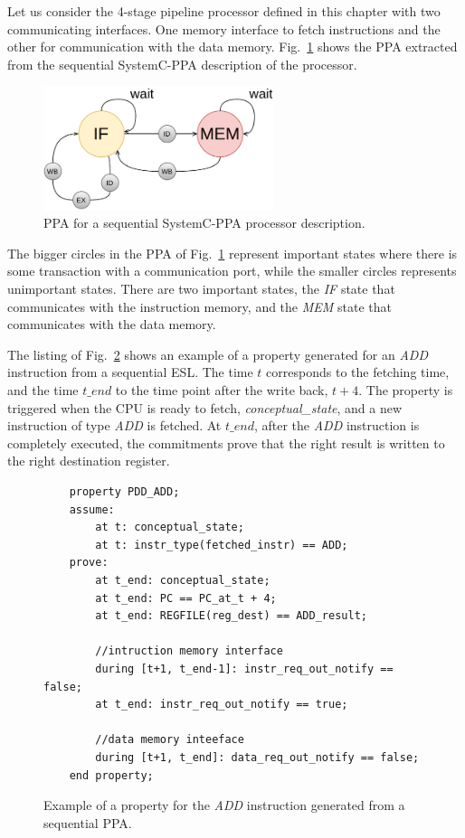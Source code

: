 Let us consider the 4-stage pipeline processor defined in this chapter with two communicating interfaces. One memory interface to fetch instructions and the other for communication with the data memory. Fig.~\ref{fig:ppa-seq} shows the PPA extracted from the sequential SystemC-PPA description of the processor. 

\begin{figure}[htb!]
	\centering
	\includegraphics[width=0.6\textwidth]{images/PPA_old.pdf}
	\caption{PPA for a sequential SystemC-PPA processor description.}
	\label{fig:ppa-seq}
\end{figure}

The bigger circles in the PPA of Fig.~\ref{fig:ppa-seq} represent important states where there is some transaction with a communication port, while the smaller circles represents unimportant states. There are two important states, the \textit{IF} state that communicates with the instruction memory, and the \textit{MEM} state that communicates with the data memory.

The listing of Fig.~\ref{fig:ex-pdd-add-ppt} shows an example of a property generated for an \textit{ADD} instruction from a sequential ESL. The time $t$ corresponds to the fetching time, and the time $t\_end$ to the time point after the write back, $t+4$. The property is triggered when the CPU is ready to fetch, \textit{conceptual\_state}, and a new instruction of type \textit{ADD} is fetched. At $t\_end$, after the \textit{ADD} instruction is completely executed, the commitments prove that the right result is written to the right destination register.

\begin{figure}[htb!]
    \begin{lstlisting}
    property PDD_ADD;
    assume:
        at t: conceptual_state;
        at t: instr_type(fetched_instr) == ADD;
    prove:
        at t_end: conceptual_state;
        at t_end: PC == PC_at_t + 4;
        at t_end: REGFILE(reg_dest) == ADD_result;
        
        //intruction memory interface
        during [t+1, t_end-1]: instr_req_out_notify == false;
        at t_end: instr_req_out_notify == true;
        
        //data memory inteeface
        during [t+1, t_end]: data_req_out_notify == false;
    end property;\end{lstlisting}
    \caption{Example of a property for the \textit{ADD} instruction generated from a sequential PPA.}
    \label{fig:ex-pdd-add-ppt}
\end{figure}

